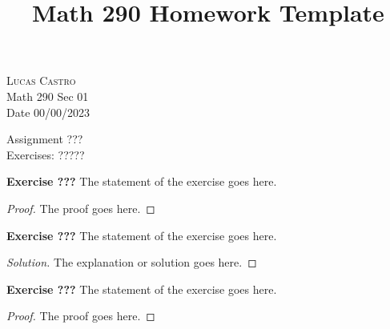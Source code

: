 \documentclass[12pt,oneside]{article}
\newenvironment{exercise}[1]{\vspace{.1in}\noindent\textbf{Exercise #1 \hspace{.05em}}}{}
\begin{document}
\title{Math 290 Homework Template}

\begin{flushright}
\textsc{Lucas Castro}  \\
Math 290 Sec 01\\
Date 00/00/2023
\end{flushright}

\begin{center}
\textsf{Assignment ???} \\
\textsf{Exercises: ?????}
\end{center}


\begin{exercise}{???}
The statement of the exercise goes here.
\end{exercise}

\begin{proof}
The proof goes here.
\end{proof}



\begin{exercise}{???}
The statement of the exercise goes here.
\end{exercise}

\begin{proof}[Solution]
The explanation or solution goes here.
\end{proof}



\begin{exercise}{???}
The statement of the exercise goes here.
\end{exercise}

\begin{proof}
The proof goes here.
\end{proof}


\end{document}
